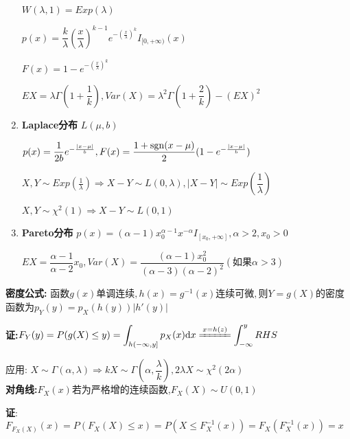 \begin{enumerate}
$ W(\lambda,1) = Exp(\lambda)$

$ p(x) = \dfrac{k}{\lambda}(\dfrac{x}{\lambda})^{k-1}e^{-(\frac{x}{\lambda})^k}I_{[0,+\infty)}(x)$

$ F(x) = 1-e^{-(\frac{x}{\lambda})^k}$

$ EX = \lambda \Gamma(1+\dfrac{1}{k}), Var(X) = \lambda^2\Gamma(1+\dfrac{2}{k})-(EX)^2$

    \item \textbf{Laplace分布} $ L(\mu,b)$

      $ p(x)=\dfrac{1}{2b}e^{-\frac{|x-\mu|}{b}}, F(x)=\dfrac{1+\operatorname{sgn}(x-\mu)}{2}(1-e^{-\frac{|x-\mu|}{b}})$

      $ X,Y\sim Exp(\frac{1}{\lambda})\Rightarrow X-Y\sim L(0,\lambda), |X-Y|\sim Exp(\dfrac{1}{\lambda})$

    $ X,Y\sim \chi^2(1)\Rightarrow X-Y\sim L(0,1)$

  \item \textbf{Pareto分布}
    $ p(x) = (\alpha-1)x_0^{\alpha-1}x^{-\alpha}I_{[x_0,+\infty]}, \alpha>2, x_0>0$

    $ EX = \dfrac{\alpha-1}{\alpha-2}x_0, Var(X) = \dfrac{(\alpha-1)x_0^2}{(\alpha-3)(\alpha-2)^2}(如果 \alpha>3)$

\end{enumerate}

\textbf{密度公式:}
函数$g(x)单调连续,h(x) = g^{-1}(x)连续可微,则Y = g(X)$的密度函数为$ p_Y(y) = p_X(h(y))|h'(y)|$

\textbf{证:}$F_Y(y) = P(g(X)\le y)=\int_{h(-\infty,y]}{p_X(x)\mathrm{d}x}
\xlongequal{x=h(z)}\int_{-\infty}^{y}RHS$

应用: $X\sim \Gamma(\alpha, \lambda) \Rightarrow  kX \sim \Gamma(\alpha, \dfrac{\lambda}{k}), 2\lambda X \sim \chi^2(2\alpha)$
\\

\textbf{对角线:}$ F_X(x)$若为严格增的连续函数,$F_X(X) \sim U(0,1)$

\textbf{证}:$ F_{F_X(X)}(x) = P(F_X(X)\le x) = P(X \le F_X^{-1}(x)) = F_X(F_X^{-1}(x)) =x$
